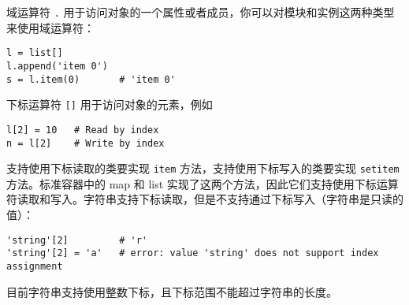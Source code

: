 域运算符 \texttt{.} 用于访问对象的一个属性或者成员，你可以对模块和实例这两种类型来使用域运算符：
\begin{lstlisting}[language=berry, numbers=none]
l = list[]
l.append('item 0')
s = l.item(0)       # 'item 0'
\end{lstlisting}

下标运算符 \texttt{[]} 用于访问对象的元素，例如
\begin{lstlisting}[language=berry, numbers=none]
l[2] = 10   # Read by index
n = l[2]    # Write by index
\end{lstlisting}

支持使用下标读取的类要实现 \texttt{item} 方法，支持使用下标写入的类要实现 \texttt{setitem} 方法。标准容器中的 map 和 list 实现了这两个方法，因此它们支持使用下标运算符读取和写入。字符串支持下标读取，但是不支持通过下标写入（字符串是只读的值）：
\begin{lstlisting}[language=berry, numbers=none]
'string'[2]         # 'r'
'string'[2] = 'a'   # error: value 'string' does not support index assignment
\end{lstlisting}

目前字符串支持使用整数下标，且下标范围不能超过字符串的长度。
